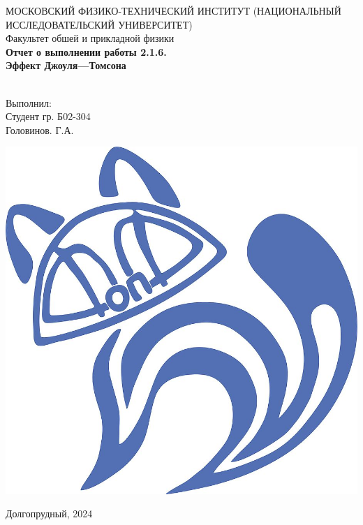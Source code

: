 \begin{titlepage}
	\begin{center}
		МОСКОВСКИЙ ФИЗИКО-ТЕХНИЧЕСКИЙ ИНСТИТУТ (НАЦИОНАЛЬНЫЙ ИССЛЕДОВАТЕЛЬСКИЙ УНИВЕРСИТЕТ) \\
		
		
		\hfill \break
		Факультет обшей и прикладной физики\\
		\vspace{2.5cm}
		\LARGE{\textbf{Отчет о выполнении работы 2.1.6. \\Эффект Джоуля---Томсона}}\\
		\hfill \break
		\\
	\end{center}
	
	\begin{flushright}
		Выполнил:\\
		Студент гр. Б02-304\\
		Головинов. Г.А.
	\end{flushright}
	
	\vfill
	
	\begin{center}
		\includegraphics[width=0.15\linewidth]{uni}
	\end{center}
	
	\begin{center} Долгопрудный, 2024 \end{center}
	
	\thispagestyle{empty}
	
\end{titlepage}